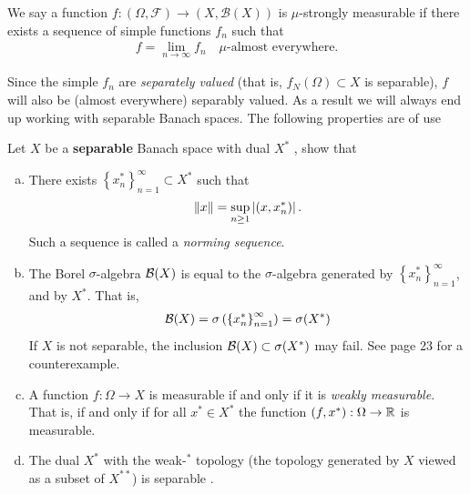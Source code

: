 \documentclass[
    a4paper,
    DIV=14,
    abstract=true,
    numbers=noenddot
]{scrartcl}
\begin{document}
\begin{definition}
	We say a function $f:(\Omega,\mathcal{F})\to (X,\mathcal{B}(X))$ is $\mu$-strongly measurable if there exists a sequence of simple functions $f_n$ such that
	\begin{align*}
		f=\lim_{n \to \infty} f_n \quad \mu\text{-almost everywhere}.
	\end{align*}
\end{definition}
Since the simple $f_n$ are \emph{separately valued} (that is, $f_N(\Omega )\subset X$ is separable), $f$ will also be (almost everywhere) separably valued. As a result we will always end up working with separable Banach spaces. The following properties are of use
\begin{exercise}\label{ex:separable}
	Let $X$ be a \textbf{separable} Banach space with dual $X^*$ , show that
	\begin{enumerate}[a)]
		\item There exists $\left\{x_n^*\right\}_{n=1}^\infty\subset X^*$ such that
		      \begin{align*}
			      \left\lVert x \right\rVert= \sup_{n \geq1} \left| (x,x_n^*) \right|.
		      \end{align*}
		      Such a sequence is called a \emph{norming sequence}.

		\item The Borel $\sigma $-algebra $\mathcal{B}(X)$ is equal to the $\sigma $-algebra generated by $\left\{x_n^*\right\}_{n=1}^\infty$, and by $X^*$. That is,
		      \begin{align*}
			      \mathcal{B}(X)=\sigma\left(\left\{x_n^*\right\}_{n=1}^ \infty\right)=\sigma(X^*)
		      \end{align*}
		      If $X$ is not separable, the inclusion $\mathcal{B}(X)\subset \sigma(X^*)$ may fail. See \cite{vakhania2012probability} page 23 for a counterexample.
		\item A function $f: \Omega \to X$ is measurable if and only if it is \emph{weakly measurable}. That is, if and only if for all $x^*\in X^*$ the function $(f,x^*): \Omega \to \mathbb{R}$ is measurable.
		\item The dual $X^*$ with the weak-$^*$ topology (the topology generated by $X$ viewed as a subset of $ X^{**}$) is separable .
	\end{enumerate}
\end{exercise}
\end{document}
